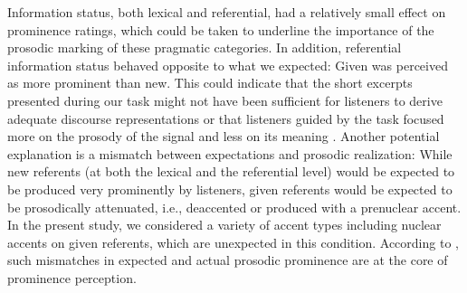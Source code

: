 Information status, both lexical and referential, had a relatively small effect on prominence ratings, which could be taken to underline the importance of the prosodic marking of these pragmatic categories. In addition, referential information status behaved opposite to what we expected: Given was perceived as more prominent than new. This could indicate that the short excerpts presented during our task might not have been sufficient for listeners to derive adequate discourse representations or that listeners guided by the task focused more on the prosody of the signal and less on its meaning \citep[e.g.,][]{coleSoundStructureMeaning2019}. Another potential explanation is a mismatch between expectations and prosodic realization: While new referents (at both the lexical and the referential level) would be expected to be produced very prominently by listeners, given referents would be expected to be prosodically attenuated, i.e., deaccented or produced with a prenuclear accent. In the present study, we considered a variety of accent types including nuclear accents on given referents, which are unexpected in this condition. According to \citet{calhounCentralityMetricalStructure2010}, such mismatches in expected and actual prosodic prominence are at the core of prominence perception.

